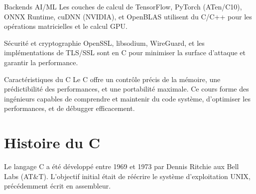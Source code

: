 \documentclass[11pt,a4paper]{article}
\begin{document}
\begin{definitionbox}{Backends AI/ML}
Les couches de calcul de TensorFlow, PyTorch (ATen/C10), ONNX Runtime, cuDNN (NVIDIA), et OpenBLAS utilisent du C/C++ pour les opérations matricielles et le calcul GPU.
\end{definitionbox}

\begin{definitionbox}{Sécurité et cryptographie}
OpenSSL, libsodium, WireGuard, et les implémentations de TLS/SSL sont en C pour minimiser la surface d'attaque et garantir la performance.
\end{definitionbox}

\begin{techbox}{Caractéristiques du C}
Le C offre un contrôle précis de la mémoire, une prédictibilité des performances, et une portabilité maximale. Ce cours forme des ingénieurs capables de comprendre et maintenir du code système, d'optimiser les performances, et de débugger efficacement.
\end{techbox}

\section{Histoire du C}

Le langage C a été développé entre 1969 et 1973 par Dennis Ritchie aux Bell Labs (AT\&T). L'objectif initial était de réécrire le système d'exploitation UNIX, précédemment écrit en assembleur.

\begin{center}
\end{center}
\end{document}
